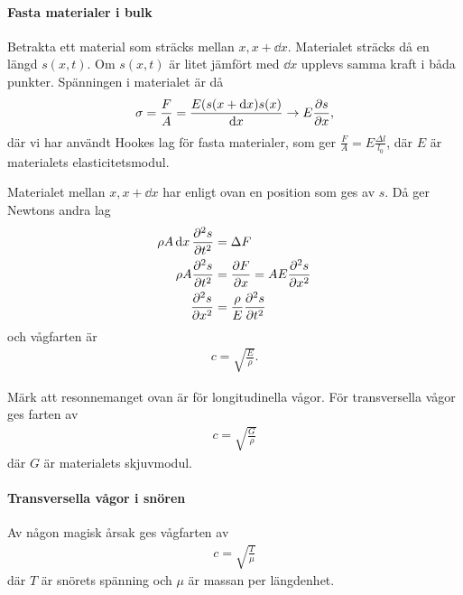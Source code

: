 \paragraph{Fasta materialer i bulk}
Betrakta ett material som sträcks mellan $x, x + \dd{x}$. Materialet sträcks då en längd $s(x, t)$. Om $s(x, t)$ är litet jämfört med $\dd{x}$ upplevs samma kraft i båda punkter. Spänningen i materialet är då
\begin{align*}
	\sigma = \frac{F}{A} = \frac{E(s(x + \dd{x})  s(x)}{\dd{x}}\to E\pdv{s}{x},
\end{align*}
där vi har användt Hookes lag för fasta materialer, som ger $\frac{F}{A} = E\frac{\Delta l}{l_0}$, där $E$ är materialets elasticitetsmodul.

Materialet mellan $x, x + \dd{x}$ har enligt ovan en position som ges av $s$. Då ger Newtons andra lag
\begin{align*}
	\rho A\dd{x}\pdv[2]{s}{t} &= \Delta F \\
	\rho A\pdv[2]{s}{t}       &= \pdv{F}{x} = AE\pdv[2]{s}{x} \\
	\pdv[2]{s}{x}             &= \frac{\rho}{E}\pdv[2]{s}{t}
\end{align*}
och vågfarten är
\begin{align*}
	c = \sqrt{\frac{E}{\rho}}.
\end{align*}

Märk att resonnemanget ovan är för longitudinella vågor. För transversella vågor ges farten av
\begin{align*}
	c = \sqrt{\frac{G}{\rho}}
\end{align*}
där $G$ är materialets skjuvmodul.

\paragraph{Transversella vågor i snören}
Av någon magisk årsak ges vågfarten av
\begin{align*}
	c = \sqrt{\frac{T}{\mu}}
\end{align*}
där $T$ är snörets spänning och $\mu$ är massan per längdenhet.